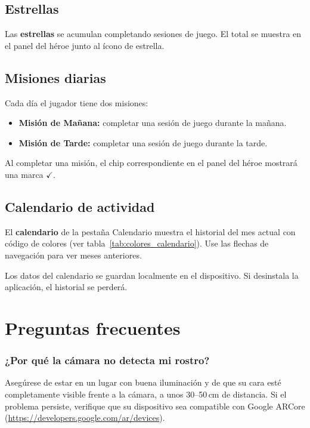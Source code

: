 \documentclass[12pt, a4paper]{article}
\begin{document}
\subsection{Estrellas}

Las \textbf{estrellas} se acumulan completando sesiones de juego. El total se muestra en el
panel del héroe junto al ícono de estrella.

\subsection{Misiones diarias}

Cada día el jugador tiene dos misiones:
\begin{itemize}[leftmargin=1.8cm, itemsep=4pt]
  \item \textbf{Misión de Mañana:} completar una sesión de juego durante la mañana.
  \item \textbf{Misión de Tarde:} completar una sesión de juego durante la tarde.
\end{itemize}

Al completar una misión, el chip correspondiente en el panel del héroe mostrará una marca $\checkmark$.

\subsection{Calendario de actividad}

El \textbf{calendario} de la pestaña Calendario muestra el historial del mes actual con
código de colores (ver tabla~\ref{tab:colores_calendario}). Use las flechas de navegación
para ver meses anteriores.

\begin{notebox}
  Los datos del calendario se guardan localmente en el dispositivo. Si desinstala la
  aplicación, el historial se perderá.
\end{notebox}

\section{Preguntas frecuentes}

\subsubsection*{¿Por qué la cámara no detecta mi rostro?}
Asegúrese de estar en un lugar con buena iluminación y de que su cara esté completamente
visible frente a la cámara, a unos 30--50\,cm de distancia. Si el problema persiste,
verifique que su dispositivo sea compatible con Google ARCore
(\url{https://developers.google.com/ar/devices}).
\end{document}

